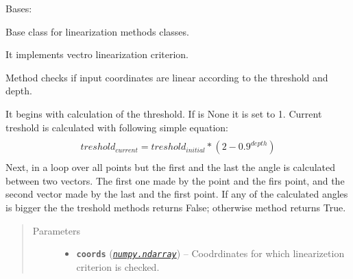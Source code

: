 \documentclass[a4paper,10pt,english]{sphinxmanual}
\begin{document}
\begin{fulllineitems}
\label{aqueduct.geom.traces:aqueduct.geom.traces.VectorLinearize}
Bases: \href{http://docs.python.org/2/library/functions.html\#object}{}

Base class for linearization methods classes.

It implements vectro linearization criterion.

\begin{fulllineitems}
\label{aqueduct.geom.traces:aqueduct.geom.traces.VectorLinearize.__init__}
\end{fulllineitems}


\begin{fulllineitems}
\label{aqueduct.geom.traces:aqueduct.geom.traces.VectorLinearize.is_linear_core}
Method checks if input coordinates are linear according to the threshold and depth.

It begins with calculation of the threshold. If  is None it is set to 1. Current treshold is calculated with following simple equation:
\begin{align*}\begin{aligned}
\begin{split}treshold_{current} = treshold_{initial} * (2 - 0.9^{depth})\end{split}\end{aligned}\end{align*}
Next, in a loop over all points but the first and the last the angle is calculated between two vectors. The first one made by the point and the firs point, and the second vector made by the last and the first point. If any of the calculated angles is bigger the the treshold methods returns False; otherwise method returns True.
\begin{quote}\begin{description}
\item[{Parameters}] \leavevmode\begin{itemize}
\item {} 
\textbf{\texttt{coords}} (\href{http://docs.scipy.org/doc/numpy/reference/generated/numpy.ndarray.html\#numpy.ndarray}{\emph{\texttt{numpy.ndarray}}}) -- Coodrdinates for which linearizetion criterion is checked.


\end{itemize}
\end{description}
\end{quote}
\end{fulllineitems}
\end{fulllineitems}
\end{document}
